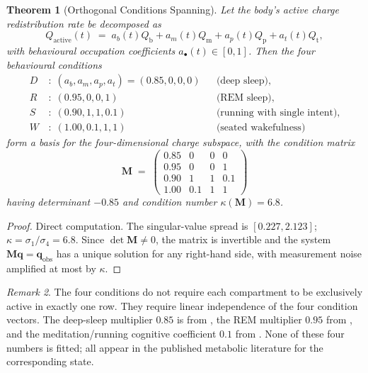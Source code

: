 \documentclass[11pt,twocolumn,a4paper]{article}
\newtheorem{theorem}{Theorem}[section]
\theoremstyle{definition}
\theoremstyle{remark}
\newtheorem{remark}[theorem]{Remark}
\newcommand{\Qb}{Q_{\mathrm{b}}}
\newcommand{\Qm}{Q_{\mathrm{m}}}
\newcommand{\Qp}{Q_{\mathrm{p}}}
\newcommand{\Qt}{Q_{\mathrm{t}}}
\begin{document}
\begin{theorem}[Orthogonal Conditions Spanning]
\label{thm:orthogonal}
Let the body's active charge redistribution rate be decomposed as
\begin{equation}
Q_{\mathrm{active}}(t) \;=\; a_b(t) \Qb + a_m(t) \Qm + a_p(t) \Qp + a_t(t) \Qt,
\end{equation}
with behavioural occupation coefficients $a_\bullet(t) \in [0, 1]$.
Then the four behavioural conditions
\begin{align*}
D \,&:\; (a_b, a_m, a_p, a_t) = (0.85, 0, 0, 0)
&& \text{(deep sleep)}, \\
R \,&:\; (0.95, 0, 0, 1)
&& \text{(REM sleep)}, \\
S \,&:\; (0.90, 1, 1, 0.1)
&& \text{(running with single intent)}, \\
W \,&:\; (1.00, 0.1, 1, 1)
&& \text{(seated wakefulness)}
\end{align*}
form a basis for the four-dimensional charge subspace, with the
condition matrix
\begin{equation}
\mathbf{M} \;=\;
\begin{pmatrix}
0.85 & 0 & 0 & 0 \\
0.95 & 0 & 0 & 1 \\
0.90 & 1 & 1 & 0.1 \\
1.00 & 0.1 & 1 & 1
\end{pmatrix}
\end{equation}
having determinant $-0.85$ and condition number $\kappa(\mathbf{M}) =
6.8$.
\end{theorem}

\begin{proof}
Direct computation. The singular-value spread is $[0.227, 2.123]$;
$\kappa = \sigma_1/\sigma_4 = 6.8$. Since $\det \mathbf{M} \neq 0$,
the matrix is invertible and the system $\mathbf{M}\mathbf{q} =
\mathbf{q}_{\mathrm{obs}}$ has a unique solution for any
right-hand side, with measurement noise amplified at most by
$\kappa$.
\end{proof}

\begin{remark}
The four conditions do not require each compartment to be exclusively
active in exactly one row. They require linear independence of the
four condition vectors. The deep-sleep multiplier $0.85$ is from
\citet{jung2011}, the REM multiplier $0.95$ from \citet{maquet1990,
madsen1991}, and the meditation/running cognitive coefficient $0.1$
from \citet{lutz2004}. None of these four numbers is fitted; all
appear in the published metabolic literature for the corresponding
state.
\end{remark}
\end{document}
